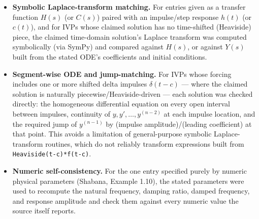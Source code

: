 \documentclass[
  11pt,
]{article}
\providecommand{\tightlist}{%
  \setlength{\itemsep}{0pt}\setlength{\parskip}{0pt}}
\begin{document}
\begin{itemize}
\tightlist
\item
  \textbf{Symbolic Laplace-transform matching.} For entries given as a
  transfer function \(H(s)\) (or \(C(s)\)) paired with an impulse/step
  response \(h(t)\) (or \(c(t)\)), and for IVPs whose claimed solution
  has no time-shifted (Heaviside) piece, the claimed time-domain
  solution's Laplace transform was computed symbolically (via SymPy) and
  compared against \(H(s)\), or against \(Y(s)\) built from the stated
  ODE's coefficients and initial conditions.
\item
  \textbf{Segment-wise ODE and jump-matching.} For IVPs whose forcing
  includes one or more shifted delta impulses \(\delta(t-c)\) --- where
  the claimed solution is naturally piecewise/Heaviside-driven --- each
  solution was checked directly: the homogeneous differential equation
  on every open interval between impulses, continuity of
  \(y, y', \dots, y^{(n-2)}\) at each impulse location, and the required
  jump of \(y^{(n-1)}\) by (impulse amplitude)/(leading coefficient) at
  that point. This avoids a limitation of general-purpose symbolic
  Laplace-transform routines, which do not reliably transform
  expressions built from \texttt{Heaviside(t-c)*f(t-c)}.
\item
  \textbf{Numeric self-consistency.} For the one entry specified purely
  by numeric physical parameters (Shabana, Example 1.10), the stated
  parameters were used to recompute the natural frequency, damping
  ratio, damped frequency, and response amplitude and check them against
  every numeric value the source itself reports.
\end{itemize}
\end{document}
